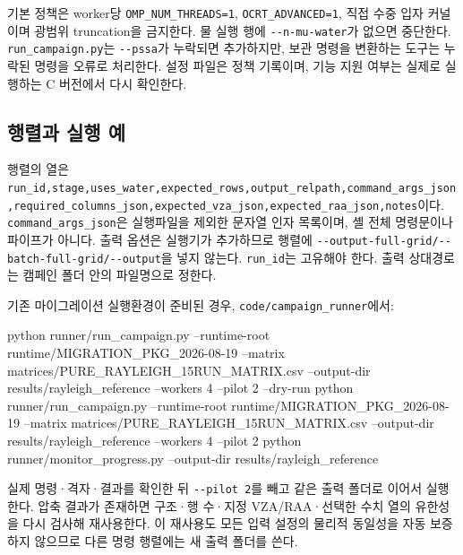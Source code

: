 기본 정책은 worker당 \texttt{OMP\_\allowbreak{}NUM\_\allowbreak{}THREADS=\allowbreak{}1}, \texttt{OCRT\_\allowbreak{}ADVANCED=\allowbreak{}1}, 직접 수중 입자 커널이며 광범위 truncation을 금지한다. 물 실행 행에 \texttt{-\allowbreak{}-\allowbreak{}n-\allowbreak{}mu-\allowbreak{}water}가 없으면 중단한다. \texttt{run\_\allowbreak{}campaign.\allowbreak{}py}는 \texttt{-\allowbreak{}-\allowbreak{}pssa}가 누락되면 추가하지만, 보관 명령을 변환하는 도구는 누락된 명령을 오류로 처리한다. 설정 파일은 정책 기록이며, 기능 지원 여부는 실제로 실행하는 C 버전에서 다시 확인한다.

\subsection{행렬과 실행 예}
\label{sec:auto:06_python_batch:10.2}
행렬의 열은 \texttt{run\_\allowbreak{}id,\allowbreak{}stage,\allowbreak{}uses\_\allowbreak{}water,\allowbreak{}expected\_\allowbreak{}rows,\allowbreak{}output\_\allowbreak{}relpath,\allowbreak{}command\_\allowbreak{}args\_\allowbreak{}json,\allowbreak{}required\_\allowbreak{}columns\_\allowbreak{}json,\allowbreak{}expected\_\allowbreak{}vza\_\allowbreak{}json,\allowbreak{}expected\_\allowbreak{}raa\_\allowbreak{}json,\allowbreak{}notes}이다. \texttt{command\_\allowbreak{}args\_\allowbreak{}json}은 실행파일을 제외한 문자열 인자 목록이며, 셸 전체 명령문이나 파이프가 아니다. 출력 옵션은 실행기가 추가하므로 행렬에 \texttt{-\allowbreak{}-\allowbreak{}output-\allowbreak{}full-\allowbreak{}grid/\allowbreak{}-\allowbreak{}-\allowbreak{}batch-\allowbreak{}full-\allowbreak{}grid/\allowbreak{}-\allowbreak{}-\allowbreak{}output}을 넣지 않는다. \texttt{run\_\allowbreak{}id}는 고유해야 한다. 출력 상대경로는 캠페인 폴더 안의 파일명으로 정한다.

기존 마이그레이션 실행환경이 준비된 경우, \texttt{code/\allowbreak{}campaign\_\allowbreak{}runner}에서:


\begin{ManualCode}
python runner/run_campaign.py --runtime-root runtime/MIGRATION_PKG_2026-08-19 --matrix matrices/PURE_RAYLEIGH_15RUN_MATRIX.csv --output-dir results/rayleigh_reference --workers 4 --pilot 2 --dry-run
python runner/run_campaign.py --runtime-root runtime/MIGRATION_PKG_2026-08-19 --matrix matrices/PURE_RAYLEIGH_15RUN_MATRIX.csv --output-dir results/rayleigh_reference --workers 4 --pilot 2
python runner/monitor_progress.py --output-dir results/rayleigh_reference
\end{ManualCode}

실제 명령·격자·결과를 확인한 뒤 \texttt{-\allowbreak{}-\allowbreak{}pilot 2}를 빼고 같은 출력 폴더로 이어서 실행한다. 압축 결과가 존재하면 구조·행 수·지정 VZA/RAA·선택한 수치 열의 유한성을 다시 검사해 재사용한다. 이 재사용도 모든 입력 설정의 물리적 동일성을 자동 보증하지 않으므로 다른 명령 행렬에는 새 출력 폴더를 쓴다.

